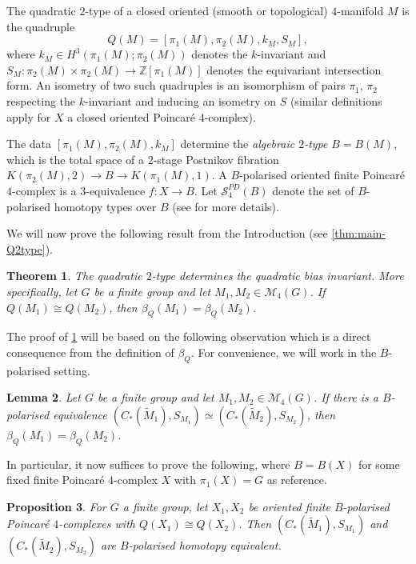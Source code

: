 \documentclass[11pt,a4paper,leqno]{amsart}
\newtheorem{theorem}{Theorem}[section]
\newtheorem{proposition}[theorem]{Proposition}
\newtheorem{lemma}[theorem]{Lemma}
\theoremstyle{definition}
\theoremstyle{remark}
\newcommand{\wt}{\widetilde}
\newcommand{\Z}{\mathbb{Z}}
\newcommand{\sM}{\mathscr{M}}
\begin{document}
The quadratic $2$-type of a closed oriented (smooth or topological) $4$-manifold $M$ is the quadruple 
\[ Q(M) = [\pi_1(M), \pi_2(M), k_M, S_M], \]
where $k_M \in H^3(\pi_1(M);\pi_2(M))$ denotes the $k$-invariant and $S_M\colon  \pi_2(M) \times \pi_2(M) \to \Z[\pi_1(M)]$ denotes the equivariant intersection form. An isometry of two such quadruples is an isomorphism of pairs $\pi_1$, $\pi_2$ respecting the $k$-invariant and inducing an isometry on $S$ (similar definitions apply for $X$ a closed oriented Poincar\'e $4$-complex).

The data $[\pi_1(M), \pi_2(M), k_M]$ determine the \emph{algebraic $2$-type} $B = B(M)$, which is the total space of a $2$-stage Postnikov fibration $K(\pi_2(M), 2) \to B \to K(\pi_1(M), 1)$. 
A $B$-polarised oriented finite Poincar\'e $4$-complex is a $3$-equivalence $f\colon X \to B$. Let  $\mathscr{S}^{PD}_4(B)$ denote the set of  $B$-polarised homotopy types over $B$ (see \cite[\S 1]{Hambleton:1988} for more details).

We will now prove the following result from the Introduction (see \cref{thm:main-Q2type}).

\begin{theorem} \label{thm:main-Q2type-body}
The quadratic $2$-type determines the quadratic bias invariant.
More specifically, let $G$ be a finite group and let $M_1, M_2 \in \sM_4(G)$. If $Q(M_1) \cong Q(M_2)$, then $\beta_Q(M_1) = \beta_Q(M_2)$.
\end{theorem}

The proof of \cref{thm:main-Q2type-body} will be based on the following observation which is a direct consequence from the definition of $\beta_Q$. For convenience, we will work in the $B$-polarised setting. 

\begin{lemma}\label{lem:Ctobeta}
Let $G$ be a finite group and let $M_1, M_2 \in \sM_4(G)$. If there is a $B$-polarised equivalence $(C_*(\wt M_1), S_{M_1}) \simeq (C_*(\wt M_2), S_{M_2})$, then $\beta_Q(M_1) = \beta_Q(M_2)$.
\end{lemma}

In particular, it now suffices to prove the following, where $B = B(X)$ for some fixed  finite Poincar\'e $4$-complex $X$  with $\pi_1(X) = G$ as reference.

\begin{proposition}\label{prop:QtoC}
For $G$ a finite group,  let $X_1, X_2$ be oriented finite $B$-polarised Poincar\'{e} $4$-complexes with $Q(X_1) \cong Q(X_2)$. 
Then $(C_*(\wt M_1), S_{M_1})$ and $(C_*(\wt M_2), S_{M_2})$ are $B$-polarised homotopy equivalent.
\end{proposition}
\end{document}
